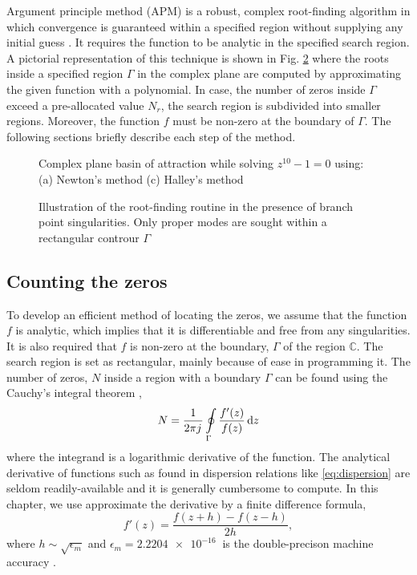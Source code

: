 \documentclass[12pt]{article}
\begin{document}
Argument principle method (APM) is a robust, complex root-finding algorithm in which convergence is guaranteed within a specified region without supplying any initial guess \cite{Delves1967c,Carpentier1982c,Botten1983,Kravanja2000c,Dellnitz2002c,Gillan2006c,Chen2017}. It requires the function to be analytic in the specified search region. A pictorial representation of this technique is shown in Fig. \ref{fig:zplane} where the roots inside a specified region $\Gamma$ in the complex plane are computed by approximating the given function with a polynomial. In case, the number of zeros inside $\Gamma$ exceed a pre-allocated value $N_r$, the search region is subdivided into smaller regions. Moreover, the function $f$ must be non-zero at the boundary of $\Gamma$. The following sections briefly describe each step of the method.
%
\begin{figure}[t!]
  \centering
   \hfil
  \caption{Complex plane basin of attraction while solving $z^{10} - 1 =0$ using: (a) Newton's method (c) Halley's method}
  \label{fig:basins}
\end{figure}
%
\begin{figure}[t!]
  \centering
  \def\svgwidth{.5\linewidth}
  
  \caption{Illustration of the root-finding routine in the presence of branch point singularities. Only proper modes are sought within a rectangular controur $\Gamma$}
  \label{fig:zplane}
\end{figure}
\subsection{Counting the zeros}
%
To develop an efficient method of locating the zeros, we assume that the function $f$ is analytic, which implies that it is differentiable and free from any singularities. It is also required that $f$ is non-zero at the boundary, $\Gamma$ of the region $\mathbb{C}$. The search region is set as rectangular, mainly because of ease in programming it. The number of zeros, $N$ inside a region with a boundary $\Gamma$ can be found using the Cauchy's integral theorem \cite[pg. 71]{Krantz1999,Delves1967c},
%
\begin{equation}
  N = \frac{1}{2 \pi j\mkern1mu} \oint \limits_{\Gamma} \frac{f'(z)}{f(z)} \mathop{}\!\mathrm{d}{z}
  \label{eq:cauchyth}
\end{equation}
%
where the integrand is a logarithmic derivative of the function. The analytical derivative of functions such as found in dispersion relations like \eqref{eq:dispersion} are seldom readily-available and it is generally cumbersome to compute. In this chapter, we use approximate the derivative by a finite difference formula,
%
\begin{equation}
  f'(z) = \frac{f(z + h) - f(z - h)}{2 h},
  \label{eq:FD}
\end{equation}
%
where $h \sim \sqrt{\epsilon_m}$ and $\epsilon_m = \SI{2.2204e-16}{}$ is the double-precison machine accuracy \cite[pg. 230]{press2007numerical}.
\end{document}
